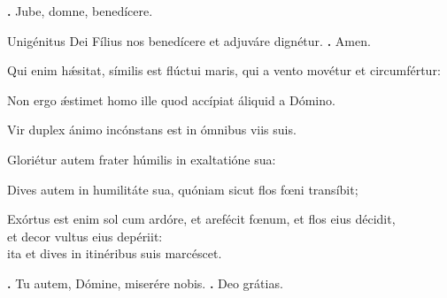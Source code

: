 \begin{small}
\textbf{\Vbar.} Jube, domne, benedícere.

Unigénitus Dei Fílius nos benedícere et adjuváre dignétur.
\textbf{\Rbar.} Amen.
\end{small}


Qui enim hǽsitat, símilis est flúctui maris, qui a vento movétur et circumfértur:

Non ergo ǽstimet homo ille quod accípiat áliquid a Dómino.

Vir duplex ánimo incónstans est in ómnibus viis suis.

Gloriétur autem frater húmilis in exaltatióne sua:

Dives autem in humilitáte sua, quóniam sicut flos fœni transíbit;

Exórtus est enim sol cum ardóre, et arefécit fœnum, et flos eius décidit,
\\et decor vultus eius depériit: \\
ita et dives in itinéribus suis marcéscet.

\textbf{\Vbar.} Tu autem, Dómine, miserére nobis.
\textbf{\Rbar.} Deo grátias.

